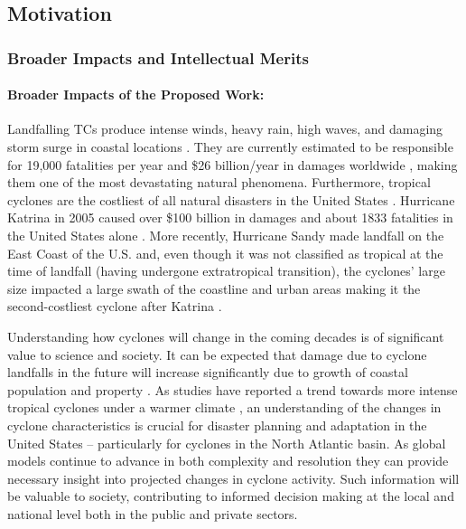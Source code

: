 \documentclass[11pt]{article}
\begin{document}
\subsection{Motivation} \label{sec:Motivation}

\subsubsection{Broader Impacts and Intellectual Merits}

\paragraph{Broader Impacts of the Proposed Work:}  

Landfalling TCs produce intense winds, heavy rain, high waves, and damaging storm surge in coastal locations \citep{EmanuelDivineWind}. They are currently estimated to be responsible for 19,000 fatalities per year and \$26 billion/year in damages worldwide \citep{Mendelsohn2012}, making them one of the most devastating natural phenomena. Furthermore, tropical cyclones are the costliest of all natural disasters in the United States \citep{Pielke1998}. Hurricane Katrina in 2005 caused over \$100 billion in damages and about 1833 fatalities in the United States alone \citep{Blake2011}. More recently, Hurricane Sandy made landfall on the East Coast of the U.S. and, even though it was not classified as tropical at the time of landfall (having undergone extratropical transition), the cyclones' large size impacted a large swath of the coastline and urban areas making it the second-costliest cyclone after Katrina \citep{Blake2013}.  

Understanding how cyclones will change in the coming decades is of significant value to science and society. It can be expected that damage due to cyclone landfalls in the future will increase significantly due to growth of coastal population and property \citep{Pielke2008}. As studies have reported a trend towards more intense tropical cyclones under a warmer climate \citep{Knutson2010}, an understanding of the changes in cyclone characteristics is crucial for disaster planning and adaptation in the United States -- particularly for cyclones in the  North Atlantic basin. As global models continue to advance in both complexity and resolution they can provide necessary insight into projected changes in cyclone activity.  Such information will be valuable to society, contributing to informed decision making at the local and national level both in the public and private sectors.
\end{document}
